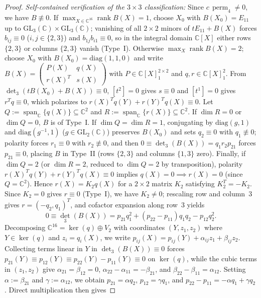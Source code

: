 \documentclass[11pt,a4paper]{article}
\theoremstyle{definition}
\DeclareMathOperator{\perm}{perm}
\DeclareMathOperator{\rank}{rank}
\DeclareMathOperator{\Span}{span}
\begin{document}
\begin{proof}
\emph{Self-contained verification of the $3\times 3$ classification:} Since $c\,\perm_4 \neq 0$, we have $B \not\equiv 0$. If $\max_{X \in \mathbb{C}^{16}} \rank B(X) = 1$, choose $X_0$ with $B(X_0) = E_{11}$ up to $\mathrm{GL}_3(\mathbb{C})\times\mathrm{GL}_3(\mathbb{C})$; vanishing of all $2\times 2$ minors of $t E_{11} + B(X)$ forces $b_{ij} \equiv 0$ ($i,j\in\{2,3\}$) and $b_{1j} b_{i1} \equiv 0$, so in the integral domain $\mathbb{C}[X]$ either rows $\{2,3\}$ or columns $\{2,3\}$ vanish (Type~I). Otherwise $\max_X \rank B(X) = 2$; choose $X_0$ with $B(X_0) = \mathrm{diag}(1,1,0)$ and write $B(X) = \left(\begin{smallmatrix} P(X) & q(X) \\ r(X)^T & s(X) \end{smallmatrix}\right)$ with $P \in \mathbb{C}[X]_1^{2\times 2}$ and $q,r \in \mathbb{C}[X]_1^2$. From $\det_3(t B(X_0) + B(X)) \equiv 0$, $[t^2] = 0$ gives $s \equiv 0$ and $[t^1] = 0$ gives $r^T q \equiv 0$, which polarizes to $r(X)^T q(Y) + r(Y)^T q(X) \equiv 0$. Let $Q := \Span_{\mathbb{C}}\{q(X)\} \subseteq \mathbb{C}^2$ and $R := \Span_{\mathbb{C}}\{r(X)\} \subseteq \mathbb{C}^2$. If $\dim R = 0$ or $\dim Q = 0$, $B$ is of Type~I. If $\dim Q = \dim R = 1$, conjugating by $\mathrm{diag}(g,1)$ and $\mathrm{diag}(g^{-1},1)$ ($g \in \mathrm{GL}_2(\mathbb{C})$) preserves $B(X_0)$ and sets $q_2 \equiv 0$ with $q_1 \not\equiv 0$; polarity forces $r_1 \equiv 0$ with $r_2 \not\equiv 0$, and then $0 \equiv \det_3(B(X)) = q_1 r_2 p_{21}$ forces $p_{21} \equiv 0$, placing $B$ in Type~II (rows $\{2,3\}$ and columns $\{1,3\}$ zero). Finally, if $\dim Q = 2$ (or $\dim R = 2$, reduced to $\dim Q = 2$ by transposition), polarity $r(X)^T q(Y) + r(Y)^T q(X) \equiv 0$ implies $q(X) = 0 \implies r(X) = 0$ (since $Q = \mathbb{C}^2$). Hence $r(X) = K_2 q(X)$ for a $2\times 2$ matrix $K_2$ satisfying $K_2^T = -K_2$. Since $K_2 = 0$ gives $r \equiv 0$ (Type~I), we have $K_2 \neq 0$; rescaling row and column~$3$ gives $r = (-q_2, q_1)^T$, and cofactor expansion along row~$3$ yields
\[
  0 \equiv \det_3(B(X)) = p_{21} q_1^2 + (p_{22} - p_{11}) q_1 q_2 - p_{12} q_2^2.
\]
Decomposing $\mathbb{C}^{16} = \ker(q) \oplus V_2$ with coordinates $(Y, z_1, z_2)$ where $Y \in \ker(q)$ and $z_i = q_i(X)$, we write $p_{ij}(X) = p_{ij}(Y) + \alpha_{ij} z_1 + \beta_{ij} z_2$. Collecting terms linear in $Y$ in $\det_3(B(X)) \equiv 0$ forces $p_{21}(Y) \equiv p_{12}(Y) \equiv p_{22}(Y) - p_{11}(Y) \equiv 0$ on $\ker(q)$, while the cubic terms in $(z_1, z_2)$ give $\alpha_{21} = \beta_{12} = 0$, $\alpha_{22} - \alpha_{11} = -\beta_{21}$, and $\beta_{22} - \beta_{11} = \alpha_{12}$. Setting $\alpha := \beta_{21}$ and $\gamma := \alpha_{12}$, we obtain $p_{21} = \alpha q_2$, $p_{12} = \gamma q_1$, and $p_{22} - p_{11} = -\alpha q_1 + \gamma q_2$. Direct multiplication then gives

\end{proof}
\end{document}
